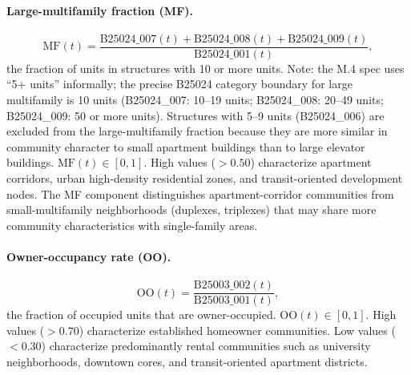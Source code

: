 \paragraph{Large-multifamily fraction (MF).}
\begin{equation}
  \mathrm{MF}(t) = \frac{\text{B25024\_007}(t) + \text{B25024\_008}(t) + \text{B25024\_009}(t)}{\text{B25024\_001}(t)},
  \label{eq:mf}
\end{equation}
the fraction of units in structures with 10 or more units.
Note: the M.4 spec uses ``5+ units'' informally; the precise B25024 category boundary for large multifamily is 10 units (B25024\_007: 10--19 units; B25024\_008: 20--49 units; B25024\_009: 50 or more units). Structures with 5--9 units (B25024\_006) are excluded from the large-multifamily fraction because they are more similar in community character to small apartment buildings than to large elevator buildings.
$\mathrm{MF}(t) \in [0,1]$.
High values ($> 0.50$) characterize apartment corridors, urban high-density
residential zones, and transit-oriented development nodes.
The MF component distinguishes apartment-corridor communities from
small-multifamily neighborhoods (duplexes, triplexes) that may share
more community characteristics with single-family areas.

\paragraph{Owner-occupancy rate (OO).}
\begin{equation}
  \mathrm{OO}(t) = \frac{\text{B25003\_002}(t)}{\text{B25003\_001}(t)},
  \label{eq:oo}
\end{equation}
the fraction of occupied units that are owner-occupied.
$\mathrm{OO}(t) \in [0,1]$.
High values ($> 0.70$) characterize established homeowner communities.
Low values ($< 0.30$) characterize predominantly rental communities such as
university neighborhoods, downtown cores, and transit-oriented apartment
districts.

